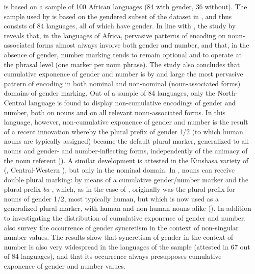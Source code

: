 \documentclass[output=collectionpaper]{langsci/langscibook}
\begin{document}
\cite{DiGarbo2014} is based on a sample of 100 African languages (84 with gender, 36 without). The sample used by \cite{DiGarbo2018} is based on the gendered subset of the dataset in \cite{DiGarbo2014}, and thus consists of 84 languages, all of which have gender. In line with \cite{Creissels2008}, the study by \cite[134]{DiGarbo2014} reveals that, in the languages of Africa, pervasive patterns of encoding on noun-associated forms almost always involve both gender and number, and that, in the absence of gender, number marking tends to remain optional and to operate at the phrasal level (one marker per noun phrase). The study also concludes that cumulative exponence of gender and number is by and large the most pervasive pattern of encoding in both nominal and non-nominal (noun-associated forms) domains of gender marking. Out of a sample of 84 languages, only the North-Central  language  is found to display non-cumulative encodings of gender and number, both on nouns and on all relevant noun-associated forms. In this language, however, non-cumulative exponence of gender and number is the result of a recent innovation whereby the plural prefix of gender 1/2 (to which human nouns are typically assigned) became the default plural marker, generalized to all nouns and gender- and number-inflecting forms, independently of the animacy of the noun referent (\citealt[187]{DiGarbo2018a}). A similar development is attested in the Kinshasa variety of  (, Central-Western ), but only in the nominal domain. In , nouns can receive double plural marking: by means of a cumulative gender/number marker and the plural prefix \textit{ba-}, which, as in the case of , originally was the plural prefix for nouns of gender 1/2, most typically human, but which is now used as a generalized plural marker, with human and non-human nouns alike (\citealt[188]{DiGarbo2018a}). In addition to investigating the distribution of cumulative exponence of gender and number, \cite{DiGarbo2018a} also survey the occurrence of gender syncretism in the context of non-singular number values. The results show that syncretism of gender in the context of number is also very widespread in the languages of the sample (attested in 67 out of 84 languages), and that its occurrence always presupposes cumulative exponence of gender and number values.
\end{document}
